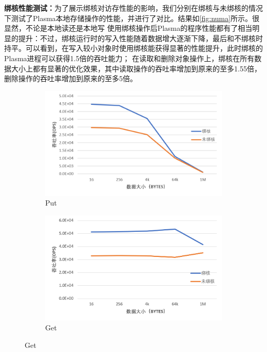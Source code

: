 \textbf{绑核性能测试：}为了展示绑核对访存性能的影响，我们分别在绑核与未绑核的情况下测试了Plasma本地存储操作的性能，并进行了对比。结果如\autoref{fig:numa}所示。很显然，不论是本地读还是本地写
使用绑核操作后Plasma的程序性能都有了相当明显的提升：不过，绑核运行时的写入性能随着数据增大逐渐下降，最后和不绑核时持平。可以看到，在写入较小对象时使用绑核能获得显著的性能提升，此时绑核的Plasma进程可以获得1.5倍的吞吐能力；
在读取和删除对象操作上，绑核在所有数据大小上都有显著的优化效果，其中读取操作的吞吐率增加到原来的至多1.55倍，删除操作的吞吐率增加到原来的至多5倍。

\begin{figure}[h]
    \begin{subfigure}{0.33\textwidth}
        \includegraphics[width=\textwidth]{image/chap04/put.png}
        \caption{Put}
    \end{subfigure}
    \begin{subfigure}{0.33\textwidth}
        \includegraphics[width=\textwidth]{image/chap04/get.png}
        \caption{Get}
    \end{subfigure}

\end{figure}
